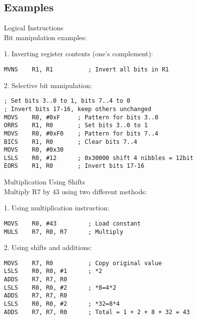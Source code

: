 \subsection{Examples}



\begin{example2}{Logical Instructions}\\
Bit manipulation examples:

1. Inverting register contents (one's complement):
\begin{lstlisting}[language=armasm, style=basesmol]
MVNS    R1, R1          ; Invert all bits in R1
\end{lstlisting}

2. Selective bit manipulation:
\begin{lstlisting}[language=armasm, style=basesmol]
; Set bits 3..0 to 1, bits 7..4 to 0
; Invert bits 17-16, keep others unchanged
MOVS    R0, #0xF     ; Pattern for bits 3..0
ORRS    R1, R0       ; Set bits 3..0 to 1
MOVS    R0, #0xF0    ; Pattern for bits 7..4
BICS    R1, R0       ; Clear bits 7..4
MOVS    R0, #0x30       
LSLS    R0, #12      ; 0x30000 shift 4 nibbles = 12bit
EORS    R1, R0       ; Invert bits 17-16
\end{lstlisting}
\end{example2}

\raggedcolumns



\begin{example2}{Multiplication Using Shifts}\\
Multiply R7 by 43 using two different methods:

1. Using multiplication instruction:
\begin{lstlisting}[language=armasm, style=basesmol]
MOVS    R0, #43         ; Load constant
MULS    R7, R0, R7      ; Multiply
\end{lstlisting}

2. Using shifts and additions:
\begin{lstlisting}[language=armasm, style=basesmol]
MOVS    R7, R0          ; Copy original value
LSLS    R0, R0, #1      ; *2
ADDS    R7, R7, R0
LSLS    R0, R0, #2      ; *8=4*2
ADDS    R7, R7, R0
LSLS    R0, R0, #2      ; *32=8*4
ADDS    R7, R7, R0      ; Total = 1 + 2 + 8 + 32 = 43
\end{lstlisting}
\end{example2}

